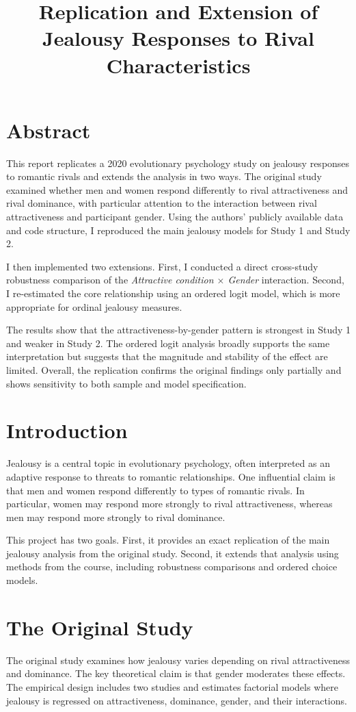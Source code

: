 \documentclass[12pt]{article}
\title{Replication and Extension of Jealousy Responses to Rival Characteristics}
\author{}
\date{}
\begin{document}
	
	\maketitle
	
	\section*{Abstract}
	This report replicates a 2020 evolutionary psychology study on jealousy responses to romantic rivals and extends the analysis in two ways. The original study examined whether men and women respond differently to rival attractiveness and rival dominance, with particular attention to the interaction between rival attractiveness and participant gender. Using the authors’ publicly available data and code structure, I reproduced the main jealousy models for Study 1 and Study 2. 
	
	I then implemented two extensions. First, I conducted a direct cross-study robustness comparison of the \textit{Attractive condition $\times$ Gender} interaction. Second, I re-estimated the core relationship using an ordered logit model, which is more appropriate for ordinal jealousy measures. 
	
	The results show that the attractiveness-by-gender pattern is strongest in Study 1 and weaker in Study 2. The ordered logit analysis broadly supports the same interpretation but suggests that the magnitude and stability of the effect are limited. Overall, the replication confirms the original findings only partially and shows sensitivity to both sample and model specification.
	
	\section{Introduction}
	Jealousy is a central topic in evolutionary psychology, often interpreted as an adaptive response to threats to romantic relationships. One influential claim is that men and women respond differently to types of romantic rivals. In particular, women may respond more strongly to rival attractiveness, whereas men may respond more strongly to rival dominance.
	
	This project has two goals. First, it provides an exact replication of the main jealousy analysis from the original study. Second, it extends that analysis using methods from the course, including robustness comparisons and ordered choice models.
	
	\section{The Original Study}
	The original study examines how jealousy varies depending on rival attractiveness and dominance. The key theoretical claim is that gender moderates these effects. The empirical design includes two studies and estimates factorial models where jealousy is regressed on attractiveness, dominance, gender, and their interactions.
	
\end{document}
